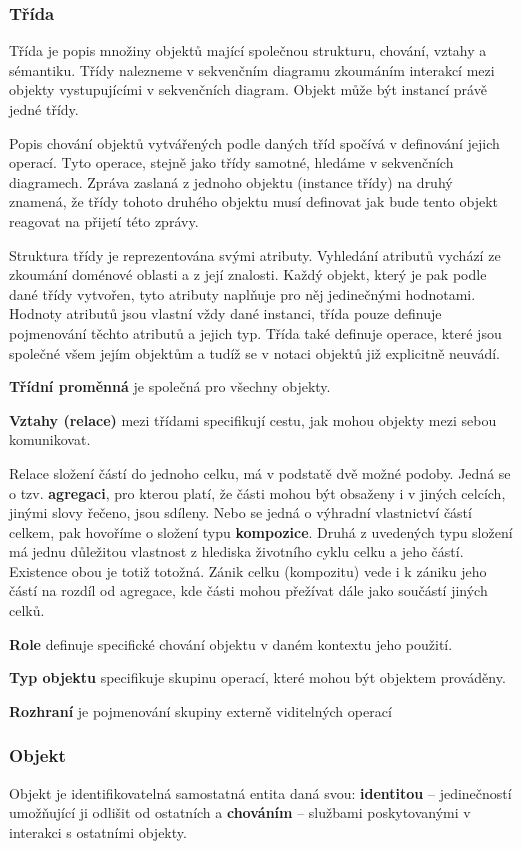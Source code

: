 \subsubsection{Třída}
Třída je popis množiny objektů mající společnou strukturu, chování, vztahy a sémantiku.  Třídy nalezneme v sekvenčním diagramu zkoumáním interakcí mezi objekty vystupujícími v sekvenčních diagram. Objekt může být instancí právě jedné třídy.

Popis chování objektů vytvářených podle daných tříd spočívá v definování jejich operací. Tyto operace, stejně jako třídy samotné, hledáme v sekvenčních diagramech.  Zpráva zaslaná z jednoho objektu (instance třídy) na druhý znamená, že třídy tohoto druhého objektu musí definovat jak bude tento objekt reagovat na přijetí této zprávy.

Struktura třídy je reprezentována svými atributy.  Vyhledání atributů vychází ze zkoumání doménové oblasti a z její znalosti.  Každý objekt, který je pak podle dané třídy vytvořen, tyto atributy naplňuje pro něj jedinečnými hodnotami. Hodnoty atributů jsou vlastní vždy dané instanci, třída pouze definuje  pojmenování těchto atributů a jejich typ.  Třída také definuje operace, které jsou společné všem jejím objektům a tudíž se v notaci objektů již explicitně neuvádí.

\textbf{Třídní proměnná} je společná pro všechny objekty.

\textbf{Vztahy (relace)} mezi třídami specifikují cestu, jak mohou objekty mezi sebou komunikovat.

Relace složení částí do jednoho celku, má v podstatě dvě možné podoby.  Jedná se o tzv. \textbf{agregaci}, pro kterou platí, že části mohou být obsaženy i v jiných celcích, jinými slovy řečeno, jsou sdíleny.  Nebo se jedná o výhradní vlastnictví částí celkem, pak hovoříme o složení typu \textbf{kompozice}. Druhá z uvedených typu složení má jednu důležitou vlastnost z hlediska životního cyklu celku a jeho částí.  Existence obou je totiž totožná.  Zánik celku (kompozitu) vede i k zániku jeho částí na rozdíl od agregace, kde části mohou přežívat dále jako součástí jiných celků.

\textbf{Role} definuje specifické chování objektu v daném kontextu jeho použití. 

\textbf{Typ objektu} specifikuje skupinu operací, které mohou být objektem prováděny.

\textbf{Rozhraní} je pojmenování skupiny externě viditelných operací


\subsubsection{Objekt}
Objekt je identifikovatelná samostatná entita daná svou: \textbf{identitou} -- jedinečností umožňující ji odlišit od ostatních a 
\textbf{chováním} -- službami poskytovanými v interakci s ostatními objekty.  

